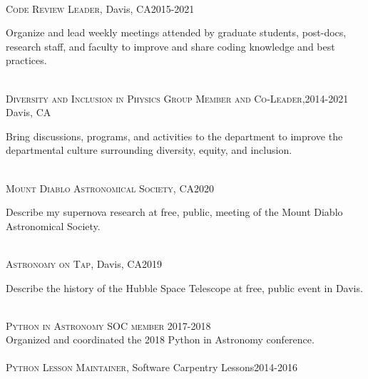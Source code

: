 \documentclass[10pt]{cv}
\begin{document}
\begin{llist}
\\
\textsc{Code Review Leader}, Davis, CA\hfill 2015-2021\\
\begin{minipage}[l]{0.7\textwidth}\vspace{0.15cm}
Organize and lead weekly meetings attended by graduate students, post-docs, research staff, and faculty to improve and share coding knowledge and best practices.\\
\end{minipage}\vspace{0.15cm}
\\
\textsc{Diversity and Inclusion in Physics Group Member and Co-Leader,}\hfill 2014-2021\\
Davis, CA \\
\begin{minipage}[l]{0.7\textwidth}\vspace{0.15cm}
Bring discussions, programs, and activities to the department to improve the departmental culture surrounding diversity, equity, and inclusion.\\
\end{minipage}\vspace{0.15cm}
\\
\textsc{Mount Diablo Astronomical Society}, CA\hfill 2020\\
\begin{minipage}[l]{0.7\textwidth}\vspace{0.15cm}
Describe my supernova research at free, public, meeting of the Mount Diablo Astronomical Society.\\
\end{minipage}\vspace{0.15cm}
\\
\textsc{Astronomy on Tap}, Davis, CA\hfill 2019\\
\begin{minipage}[l]{0.7\textwidth}\vspace{0.15cm}
Describe the history of the Hubble Space Telescope at free, public event in Davis.\\
\end{minipage}\vspace{0.15cm}
%
\\
\textsc{Python in Astronomy SOC member} \hfill 2017-2018\\
Organized and coordinated the 2018 Python in Astronomy conference.\\
\\
\textsc{Python Lesson Maintainer}, Software Carpentry Lessons\hfill 2014-2016\\

\end{llist}
\end{document}
